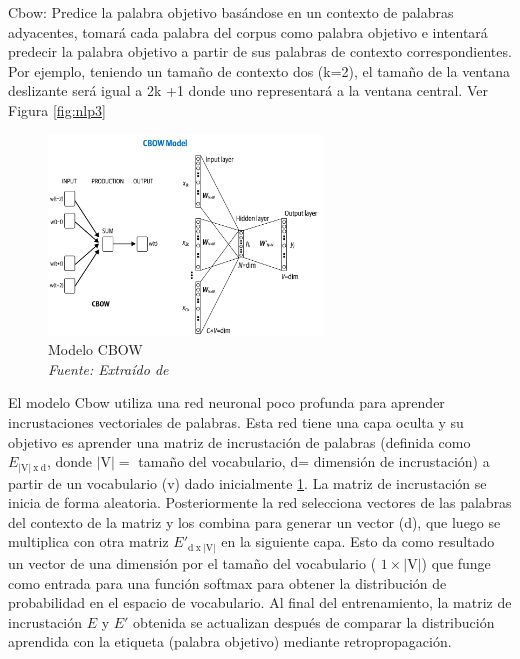 \begin{itemize}
\begin{itemize}
Cbow: Predice la palabra objetivo basándose en un contexto de palabras adyacentes, tomará cada palabra del corpus como palabra objetivo e intentará predecir la palabra objetivo a partir de sus palabras de contexto correspondientes. Por ejemplo, teniendo un tamaño de contexto dos (k=2), el  tamaño de la ventana deslizante será igual a 2k +1 donde uno representará  a la ventana central. Ver Figura \ref{fig:nlp3}



\begin{figure}[h!]
	\includegraphics[width=0.65\textwidth]{capitulo3/figuras/nlp4.png}
	\caption[Modelo CBOW]{Modelo CBOW
		\\\textit{Fuente: Extraído de} \protect\cite[p. 100]{vajjala2020practical}}
	\label{fig:nlp4}
\end{figure}

El modelo Cbow utiliza una red neuronal poco profunda para aprender incrustaciones vectoriales de palabras. Esta red tiene una capa oculta y su objetivo es aprender una matriz de incrustación de palabras (definida como $E_{ \left | \textrm{V}  \right |\: \textrm{x} \: \textrm{d}}$,  donde $\left | \textrm{V}  \right | = $ tamaño del vocabulario, d= dimensión de incrustación)  a partir de un vocabulario (v)  dado inicialmente  \ref{fig:nlp4}. La matriz de incrustación se inicia de forma aleatoria. Posteriormente  la red selecciona vectores de las palabras del contexto de la matriz y los combina para generar un vector (d), que luego se multiplica con otra matriz ${E}'_{ \textrm{d} \: \textrm{x}  \:\left | \textrm{V}  \right | }$ en la siguiente capa. Esto da como resultado un vector de una dimensión por el tamaño del vocabulario ( $1 \times \left | \textrm{V}  \right |$) que funge como entrada para una función softmax para obtener la distribución de probabilidad en el espacio de vocabulario. Al final del entrenamiento, la matriz de incrustación $E$ y $E'$ obtenida se actualizan después de comparar la distribución aprendida con la etiqueta (palabra objetivo) mediante retropropagación.


\end{itemize}
\end{itemize}
